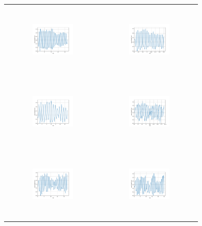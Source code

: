 \begin{figure}[H]
\begin{center}
\begin{tabular}{cc}
\includegraphics[width=0.45\textwidth, height=3.5cm]{graph/omega=2.50_A=1_wave.pdf}
&
\includegraphics[width=0.45\textwidth, height=3.5cm]{graph/omega=2.50_A=2_wave.pdf}\\
\includegraphics[width=0.45\textwidth, height=3.5cm]{graph/omega=2.50_A=3_wave.pdf}
&
\includegraphics[width=0.45\textwidth, height=3.5cm]{graph/omega=2.50_A=4_wave.pdf}\\
\includegraphics[width=0.45\textwidth, height=3.5cm]{graph/omega=2.50_A=5_wave.pdf}
&
\includegraphics[width=0.45\textwidth, height=3.5cm]{graph/omega=2.50_A=6_wave.pdf}\\

\end{tabular}
\end{center}
\end{figure}

